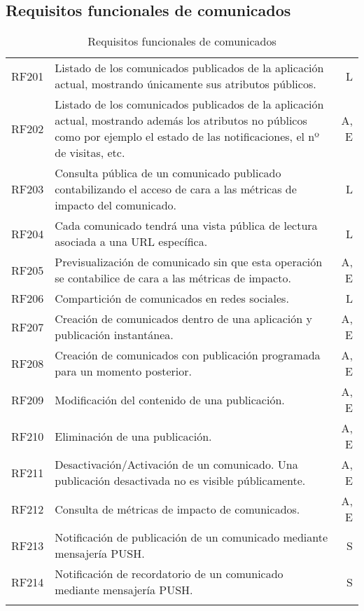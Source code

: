 \subsection{Requisitos funcionales de comunicados}
\label{cuadro:requisitos-funcionales-de-comunicados}
\begin{longtable}{l|p{13cm}|r}
  RF201\label{RF201} & Listado de los comunicados publicados de la aplicación actual, mostrando únicamente sus atributos públicos. & L \\
  RF202\label{RF202} & Listado de los comunicados publicados de la aplicación actual, mostrando además los atributos no públicos como por ejemplo el estado de las notificaciones, el nº de visitas, etc. & A, E \\
  RF203\label{RF203} & Consulta pública de un comunicado publicado contabilizando el acceso de cara a las métricas de impacto del comunicado. & L \\
  RF204\label{RF204} & Cada comunicado tendrá una vista pública de lectura asociada a una URL específica. & L \\
  RF205\label{RF205} & Previsualización de comunicado sin que esta operación se contabilice de cara a las métricas de impacto. & A, E \\
  RF206\label{RF206} & Compartición de comunicados en redes sociales. & L \\
  RF207\label{RF207} & Creación de comunicados dentro de una aplicación y publicación instantánea. & A, E \\
  RF208\label{RF208} & Creación de comunicados con publicación programada para un momento posterior. & A, E \\
  RF209\label{RF209} & Modificación del contenido de una publicación. & A, E \\
  RF210\label{RF210} & Eliminación de una publicación. & A, E \\
  RF211\label{RF211} & Desactivación/Activación de un comunicado. Una publicación desactivada no es visible públicamente. & A, E \\
  RF212\label{RF212} & Consulta de métricas de impacto de comunicados. & A, E \\
  RF213\label{RF213} & Notificación de publicación de un comunicado mediante mensajería PUSH. & S \\
  RF214\label{RF214} & Notificación de recordatorio de un comunicado mediante mensajería PUSH. & S \\
  \caption{Requisitos funcionales de comunicados} \\
\end{longtable}

